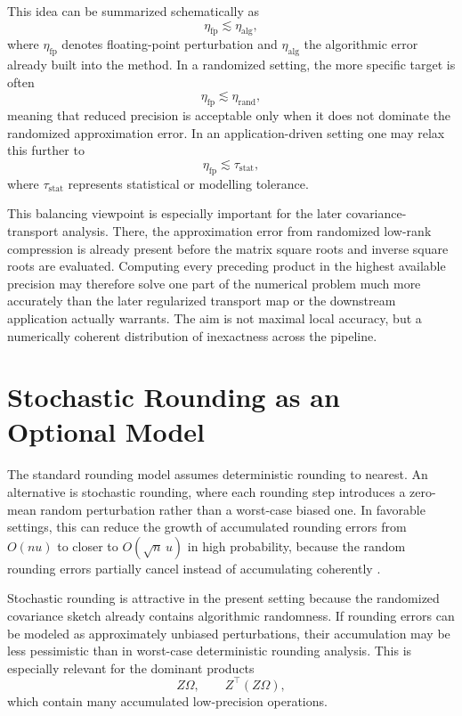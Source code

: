 This idea can be summarized schematically as
\[
	\eta_{\mathrm{fp}} \lesssim \eta_{\mathrm{alg}},
\]
where \(\eta_{\mathrm{fp}}\) denotes floating-point perturbation and
\(\eta_{\mathrm{alg}}\) the algorithmic error already built into the method. In a
randomized setting, the more specific target is often
\[
	\eta_{\mathrm{fp}} \lesssim \eta_{\mathrm{rand}},
\]
meaning that reduced precision is acceptable only when it does not dominate the
randomized approximation error. In an application-driven setting one may relax
this further to
\[
	\eta_{\mathrm{fp}} \lesssim \tau_{\mathrm{stat}},
\]
where \(\tau_{\mathrm{stat}}\) represents statistical or modelling tolerance.

This balancing viewpoint is especially important for the later covariance-transport
analysis. There, the approximation error from randomized low-rank compression is
already present before the matrix square roots and inverse square roots are
evaluated. Computing every preceding product in the highest available precision
may therefore solve one part of the numerical problem much more accurately than
the later regularized transport map or the downstream application actually
warrants. The aim is not maximal local accuracy, but a numerically coherent
distribution of inexactness across the pipeline.

\section{Stochastic Rounding as an Optional Model}

The standard rounding model assumes deterministic rounding to nearest. An
alternative is stochastic rounding, where each rounding step introduces a
zero-mean random perturbation rather than a worst-case biased one. In favorable
settings, this can reduce the growth of accumulated rounding errors from
\(O(nu)\) to closer to \(O(\sqrt{n}\,u)\) in high probability, because the
random rounding errors partially cancel instead of accumulating coherently
\cite{higham2022mixed}.

Stochastic rounding is attractive in the present setting because the randomized
covariance sketch already contains algorithmic randomness. If rounding errors can
be modeled as approximately unbiased perturbations, their accumulation may be
less pessimistic than in worst-case deterministic rounding analysis. This is
especially relevant for the dominant products
\[
	Z\Omega, \qquad Z^\top(Z\Omega),
\]
which contain many accumulated low-precision operations.

